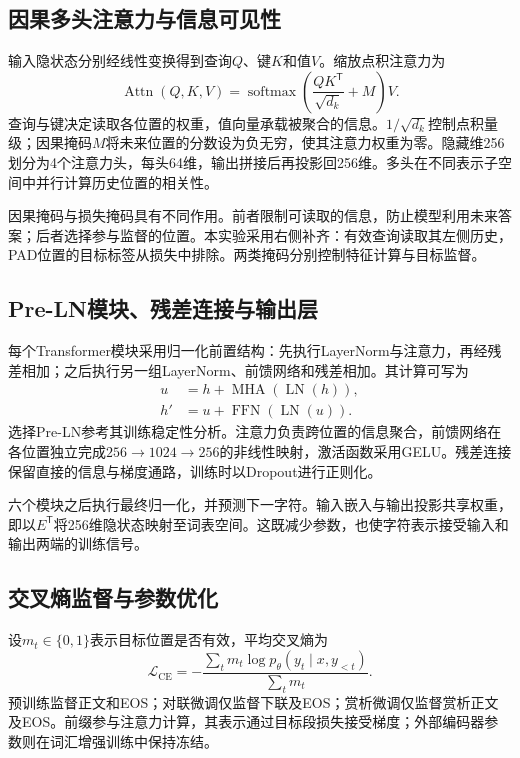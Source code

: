 \subsection{因果多头注意力与信息可见性}

输入隐状态分别经线性变换得到查询$Q$、键$K$和值$V$。缩放点积注意力为
\begin{equation}
 \operatorname{Attn}(Q,K,V)=\operatorname{softmax}\!\left(\frac{QK^{\mathsf T}}{\sqrt{d_k}}+M\right)V.
 \label{eq:attention}
\end{equation}
查询与键决定读取各位置的权重，值向量承载被聚合的信息。$1/\sqrt{d_k}$控制点积量级；因果掩码$M$将未来位置的分数设为负无穷，使其注意力权重为零。隐藏维256划分为4个注意力头，每头64维，输出拼接后再投影回256维。多头在不同表示子空间中并行计算历史位置的相关性。

因果掩码与损失掩码具有不同作用。前者限制可读取的信息，防止模型利用未来答案；后者选择参与监督的位置。本实验采用右侧补齐：有效查询读取其左侧历史，PAD位置的目标标签从损失中排除。两类掩码分别控制特征计算与目标监督。

\subsection{Pre-LN模块、残差连接与输出层}

每个Transformer模块采用归一化前置结构：先执行LayerNorm与注意力，再经残差相加；之后执行另一组LayerNorm、前馈网络和残差相加。其计算可写为
\begin{align}
 u&=h+\operatorname{MHA}(\operatorname{LN}(h)),\\
 h'&=u+\operatorname{FFN}(\operatorname{LN}(u)).
\end{align}
选择Pre-LN参考其训练稳定性分析\cite{preln}。注意力负责跨位置的信息聚合，前馈网络在各位置独立完成$256\to1024\to256$的非线性映射，激活函数采用GELU。残差连接保留直接的信息与梯度通路，训练时以Dropout进行正则化。

六个模块之后执行最终归一化，并预测下一字符。输入嵌入与输出投影共享权重\cite{tied}，即以$E^{\mathsf T}$将256维隐状态映射至词表空间。这既减少参数，也使字符表示接受输入和输出两端的训练信号。

\subsection{交叉熵监督与参数优化}

设$m_t\in\{0,1\}$表示目标位置是否有效，平均交叉熵为
\begin{equation}
 \mathcal{L}_{\mathrm{CE}}=-\frac{\sum_t m_t\log p_\theta(y_t\mid x,y_{<t})}{\sum_t m_t}.
 \label{eq:ce}
\end{equation}
预训练监督正文和EOS；对联微调仅监督下联及EOS；赏析微调仅监督赏析正文及EOS。前缀参与注意力计算，其表示通过目标段损失接受梯度；外部编码器参数则在词汇增强训练中保持冻结。

